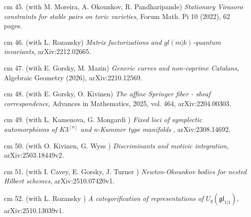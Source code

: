 \documentclass[11pt]{amsart}
\theoremstyle{plain}
\theoremstyle{definition}
\theoremstyle{remark}
\begin{document}
\noindent{} cm 45. (with M. Moreira, A. Okounkov, R. Pandharipande)
{\it  Stationary Virasoro constraints for stable pairs on toric varieties}, Forum Math. Pi 10 (2022), 62 pages.


\noindent{} cm 46. (with L. Rozansky)
{\it  Matrix factorizations and \(gl(m|k)\)-quantum invariants}, arXiv:2212.02665.

\noindent{} cm 47. (with E. Gorsky, M. Mazin)
{\it  Generic curves and non-coprime Catalans}, Algebraic Geometry (2026), arXiv:2210.12569.

\noindent{} cm 48. (with E. Gorsky, O. Kivinen)
{\it The affine Springer fiber - sheaf correspondence}, {Advances in Mathematics},
 2025,
  vol. 464, arXiv:2204.00303.

\noindent{} cm 49. (with L. Kamenova, G. Mongardi )
{\it Fixed loci of symplectic automorphisms of \(K3^{[n]}\) and n-Kummer type manifolds
}, arXiv:2308.14692.

\noindent{} cm 50. (with O. Kivinen, G. Wyss )
{\it Discriminants and motivic integration},
  arXiv:2503.18449v2.



\noindent{} cm 51. (with I. Cavey, E. Gorsky, J. Turner )
{\it Newton-Okounkov bodies for nested Hilbert schemes},
arXiv:2510.07420v1.




\noindent{} cm 52. (with L. Rozansky )
{\it A categorification of representations of
                  $U_q(\mathfrak{gl}_{1|1})$},
 arXiv:2510.13039v1.
\end{document}
